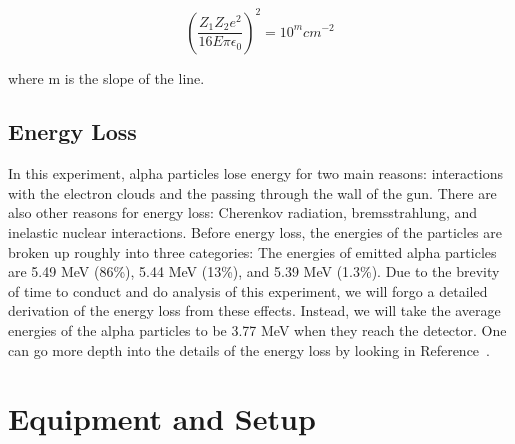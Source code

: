 \begin{equation}
\left  (\frac{Z_1Z_2e^2}{16E \pi \epsilon_0} \right )^2 = 10^{m} cm^{-2}
\label{PrecedingTerm}
\end{equation}

where m is the slope of the line. 

\subsection{Energy Loss}

In this experiment, alpha particles lose energy for two main reasons: interactions with the electron clouds and the passing through the wall of the gun. There are also other reasons for energy loss: Cherenkov radiation, bremsstrahlung, and inelastic nuclear interactions. Before energy loss, the energies of the particles are broken up roughly into three categories: The energies of emitted alpha particles are 5.49 MeV (86\%), 5.44 MeV (13\%), and 5.39 MeV (1.3\%). Due to the brevity of time to conduct and do analysis of this experiment, we will forgo a detailed derivation of the energy loss from these effects. Instead, we will take the average energies of the alpha particles to be 3.77 MeV when they reach the detector. One can go more depth into the details of the energy loss by looking in Reference~\cite{Comfort}.

\section{Equipment and Setup}

